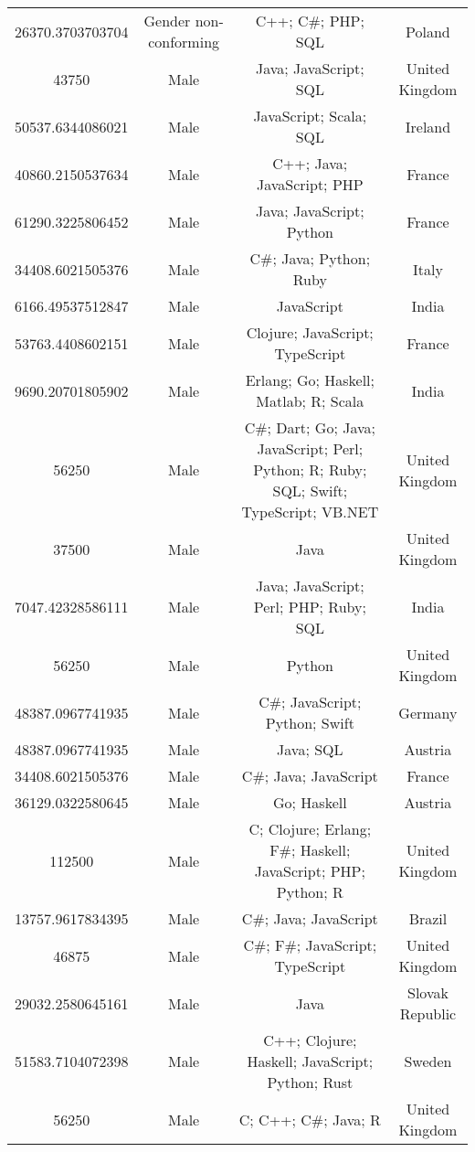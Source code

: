 \begin{center}
\begin{tabular}{ |c|c|c|c| }
26370.3703703704  &  Gender non-conforming  &  C++; C\#; PHP; SQL  &  Poland  \\ 
43750  &  Male  &  Java; JavaScript; SQL  &  United Kingdom  \\ 
50537.6344086021  &  Male  &  JavaScript; Scala; SQL  &  Ireland  \\ 
40860.2150537634  &  Male  &  C++; Java; JavaScript; PHP  &  France  \\ 
61290.3225806452  &  Male  &  Java; JavaScript; Python  &  France  \\ 
34408.6021505376  &  Male  &  C\#; Java; Python; Ruby  &  Italy  \\ 
6166.49537512847  &  Male  &  JavaScript  &  India  \\ 
53763.4408602151  &  Male  &  Clojure; JavaScript; TypeScript  &  France  \\ 
9690.20701805902  &  Male  &  Erlang; Go; Haskell; Matlab; R; Scala  &  India  \\ 
56250  &  Male  &  C\#; Dart; Go; Java; JavaScript; Perl; Python; R; Ruby; SQL; Swift; TypeScript; VB.NET  &  United Kingdom  \\ 
37500  &  Male  &  Java  &  United Kingdom  \\ 
7047.42328586111  &  Male  &  Java; JavaScript; Perl; PHP; Ruby; SQL  &  India  \\ 
56250  &  Male  &  Python  &  United Kingdom  \\ 
48387.0967741935  &  Male  &  C\#; JavaScript; Python; Swift  &  Germany  \\ 
48387.0967741935  &  Male  &  Java; SQL  &  Austria  \\ 
34408.6021505376  &  Male  &  C\#; Java; JavaScript  &  France  \\ 
36129.0322580645  &  Male  &  Go; Haskell  &  Austria  \\ 
112500  &  Male  &  C; Clojure; Erlang; F\#; Haskell; JavaScript; PHP; Python; R  &  United Kingdom  \\ 
13757.9617834395  &  Male  &  C\#; Java; JavaScript  &  Brazil  \\ 
46875  &  Male  &  C\#; F\#; JavaScript; TypeScript  &  United Kingdom  \\ 
29032.2580645161  &  Male  &  Java  &  Slovak Republic  \\ 
51583.7104072398  &  Male  &  C++; Clojure; Haskell; JavaScript; Python; Rust  &  Sweden  \\ 
56250  &  Male  &  C; C++; C\#; Java; R  &  United Kingdom  \\ 

\end{tabular}
\end{center}
